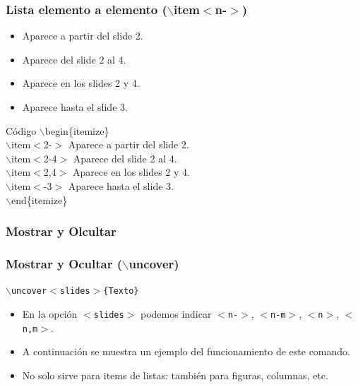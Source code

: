 \documentclass[aspectratio=43]{beamer}%
\begin{document}
\begin{frame}[fragile]
\frametitle{\textbf{Lista elemento a elemento ($\backslash$item$<$n-$>$)}}
\justifying
 \begin{itemize}
\item<2-> Aparece a partir del slide 2.
 \item<2-4> Aparece del slide 2 al 4. 
 \item<2,4> Aparece en los slides 2 y 4. 
 \item<-3> Aparece hasta el slide 3. 
\end{itemize}  
 
\begin{exampleblock}{Código}
$\backslash$begin\{itemize\}\\
$\backslash$item$<$2-$>$ Aparece a partir del slide 2.\\
 $\backslash$item$<$2-4$>$ Aparece del slide 2 al 4. \\
 $\backslash$item$<$2,4$>$ Aparece en los slides 2 y 4.\\ 
$\backslash$item$<$-3$>$ Aparece hasta el slide 3. \\
$\backslash$end\{itemize\}    
\end{exampleblock}


\end{frame}

\subsubsection{Mostrar y Olcultar}
\begin{frame}[fragile]
\frametitle{\textbf{Mostrar y Ocultar ($\backslash$uncover)}}
\justifying
 \texttt{$\backslash$uncover$<$slides$>$\{Texto\}}
 \begin{itemize}\justifying
  \item En la opción \texttt{$<$slides$>$} podemos indicar \texttt{$<$n-$>$}, \texttt{$<$n-m$>$}, \texttt{$<$n$>$}, \texttt{$<$n,m$>$}.
  \item A continuación se muestra un ejemplo del funcionamiento de este comando.
  \item No solo sirve para items de listas: también para figuras, columnas, etc.
\end{itemize}

\end{frame}
\end{document}
